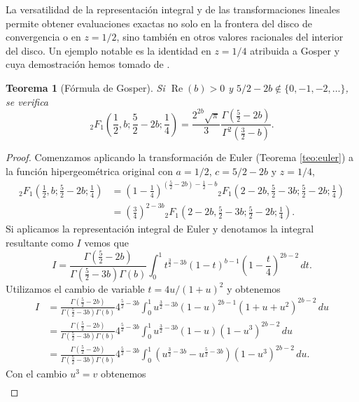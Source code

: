 \documentclass[12pt,a4paper]{book}
\renewcommand{\Re}{\operatorname{Re}}
\newtheorem{theorem}{Teorema}
\begin{document}
La versatilidad de la representación integral y de las transformaciones lineales permite obtener evaluaciones exactas no solo en la frontera del disco de convergencia o en $z=1/2$, sino también en otros valores racionales del interior del disco. Un ejemplo notable es la identidad en $z=1/4$ atribuida a Gosper y cuya demostración hemos tomado de \cite{hakimoglu2026gosper}.

\begin{theorem}[Fórmula de Gosper]
\label{teo:gosper}
Si $\Re(b) > 0$ y $5/2 - 2b \notin \{0, -1, -2, \dots\}$, se verifica
\[
{}_{2}F_{1}\left(\frac{1}{2}, b; \frac{5}{2}-2b; \frac{1}{4}\right) = \frac{2^{2b}\sqrt{\pi}}{3}\frac{\Gamma(\frac{5}{2}-2b)}{\Gamma^{2}(\frac{3}{2}-b)}.
\]
\end{theorem}

\begin{proof}
Comenzamos aplicando la transformación de Euler (Teorema \ref{teo:euler}) a la función hipergeométrica original con $a=1/2$, $c=5/2-2b$ y $z=1/4$,
\begin{align*}
    {}_{2}F_{1}\left(\frac{1}{2}, b; \frac{5}{2}-2b; \frac{1}{4}\right) &= \left(1-\frac{1}{4}\right)^{\left(\frac{5}{2}-2b\right)-\frac{1}{2}-b} {}_{2}F_{1}\left(2-2b, \frac{5}{2}-3b; \frac{5}{2}-2b; \frac{1}{4}\right) \\
    &= \left(\frac{3}{4}\right)^{2-3b} {}_{2}F_{1}\left(2-2b, \frac{5}{2}-3b; \frac{5}{2}-2b; \frac{1}{4}\right).
\end{align*}
Si aplicamos la representación integral de Euler y denotamos la integral resultante como $I$ vemos que
\[
    I = \frac{\Gamma(\frac{5}{2}-2b)}{\Gamma(\frac{5}{2}-3b)\Gamma(b)} \int_{0}^{1} t^{\frac{3}{2}-3b} (1-t)^{b-1} \left(1-\frac{t}{4}\right)^{2b-2} \, dt.
\]
Utilizamos el cambio de variable $t = 4u/(1+u)^2$ y obtenemos
\begin{align*}
     I &= \frac{\Gamma(\frac{5}{2}-2b)}{\Gamma(\frac{5}{2}-3b)\Gamma(b)} 4^{\frac{5}{2}-3b} \int_{0}^{1} u^{\frac{3}{2}-3b} (1-u)^{2b-1} (1+u+u^2)^{2b-2} \, du \\
     &= \frac{\Gamma(\frac{5}{2}-2b)}{\Gamma(\frac{5}{2}-3b)\Gamma(b)} 4^{\frac{5}{2}-3b} \int_{0}^{1} u^{\frac{3}{2}-3b} (1-u) (1-u^3)^{2b-2} \, du \\
     &= \frac{\Gamma(\frac{5}{2}-2b)}{\Gamma(\frac{5}{2}-3b)\Gamma(b)} 4^{\frac{5}{2}-3b} \int_{0}^{1} \left(u^{\frac{3}{2}-3b} - u^{\frac{5}{2}-3b}\right) (1-u^3)^{2b-2} \, du.
\end{align*}
Con el cambio $u^3 = v$ obtenemos
\begin{align*}

\end{align*}
\end{proof}
\end{document}
